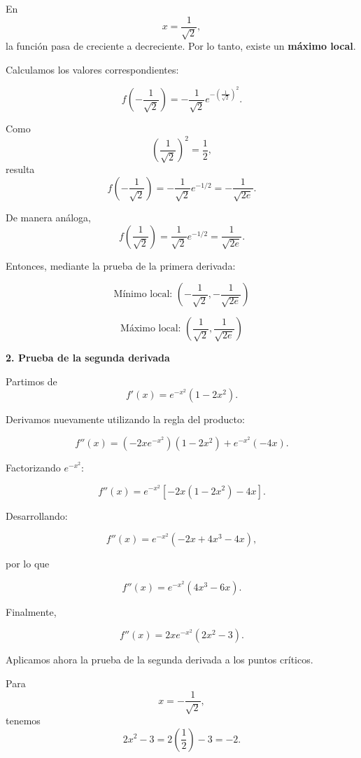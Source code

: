 \documentclass[12pt]{article}
\begin{document}
\begin{enumerate}[label=\alph*.-]
    En
    \[
    x=\frac{1}{\sqrt2},
    \]
    la función pasa de creciente a decreciente. Por lo tanto,
    existe un \textbf{máximo local}.

    Calculamos los valores correspondientes:

    \[
    f\left(-\frac{1}{\sqrt2}\right)
    =
    -\frac{1}{\sqrt2}
    e^{-\left(\frac{1}{\sqrt2}\right)^2}.
    \]

    Como
    \[
    \left(\frac{1}{\sqrt2}\right)^2=\frac12,
    \]
    resulta
    \[
    f\left(-\frac{1}{\sqrt2}\right)
    =
    -\frac{1}{\sqrt2}e^{-1/2}
    =
    -\frac{1}{\sqrt{2e}}.
    \]

    De manera análoga,
    \[
    f\left(\frac{1}{\sqrt2}\right)
    =
    \frac{1}{\sqrt2}e^{-1/2}
    =
    \frac{1}{\sqrt{2e}}.
    \]

    Entonces, mediante la prueba de la primera derivada:

    \[
    \boxed{
    \text{Mínimo local: }
    \left(-\frac{1}{\sqrt2},
    -\frac{1}{\sqrt{2e}}\right)
    }
    \]

    \[
    \boxed{
    \text{Máximo local: }
    \left(\frac{1}{\sqrt2},
    \frac{1}{\sqrt{2e}}\right)
    }
    \]

    \vspace{0.5cm}

    \textbf{2. Prueba de la segunda derivada}

    Partimos de
    \[
    f'(x)=e^{-x^2}(1-2x^2).
    \]

    Derivamos nuevamente utilizando la regla del producto:

    \[
    f''(x)
    =
    (-2xe^{-x^2})(1-2x^2)
    +
    e^{-x^2}(-4x).
    \]

    Factorizando $e^{-x^2}$:

    \[
    f''(x)
    =
    e^{-x^2}
    \left[-2x(1-2x^2)-4x\right].
    \]

    Desarrollando:

    \[
    f''(x)
    =
    e^{-x^2}
    \left(-2x+4x^3-4x\right),
    \]

    por lo que

    \[
    f''(x)
    =
    e^{-x^2}(4x^3-6x).
    \]

    Finalmente,

    \[
    \boxed{
    f''(x)=2xe^{-x^2}(2x^2-3)
    }.
    \]

    Aplicamos ahora la prueba de la segunda derivada a los puntos
    críticos.

    Para
    \[
    x=-\frac{1}{\sqrt2},
    \]
    tenemos
    \[
    2x^2-3
    =
    2\left(\frac12\right)-3
    =
    -2.
    \]


\end{enumerate}
\end{document}
